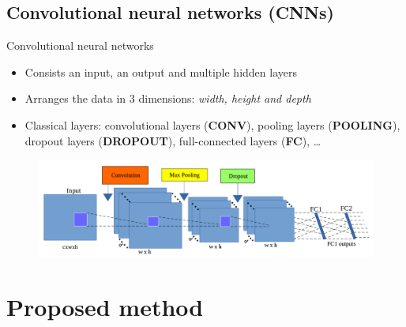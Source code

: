 \documentclass[10pt,svgnames]{beamer}
\begin{document}
\subsection{Convolutional neural networks (CNNs)}
\begin{frame}{Convolutional neural networks}
	\begin{itemize}
		\item Consists an input, an output and multiple hidden layers\footnotemark[1]
		\item Arranges the data in $3$ dimensions: \textit{width, height and depth}
		\item Classical layers: convolutional layers (\textbf{\color{orange}CONV}), pooling layers (\textbf{\color{yellow}POOLING}), dropout layers (\textbf{\color{green}DROPOUT}), full-connected layers (\textbf{\color{blue}FC}), \ldots
	\end{itemize}
	\begin{figure}[htbp]
  		\centering
   	 	\includegraphics[scale=.27]{images/arch_cnn}
	\end{figure}
\end{frame}
\section{Proposed method}
\end{document}
